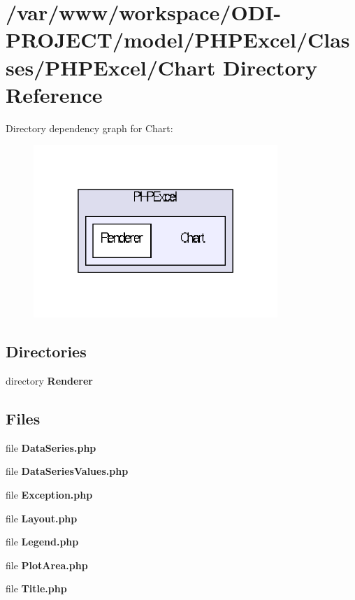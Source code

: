 \section{/var/www/workspace/\+O\+D\+I-\/\+P\+R\+O\+J\+E\+C\+T/model/\+P\+H\+P\+Excel/\+Classes/\+P\+H\+P\+Excel/\+Chart Directory Reference}
\label{dir_72b6e6015998bbe040ec2c6611d94f5b}
Directory dependency graph for Chart\+:\nopagebreak
\begin{figure}[H]
\begin{center}
\leavevmode
\includegraphics[width=262pt]{dir_72b6e6015998bbe040ec2c6611d94f5b_dep}
\end{center}
\end{figure}
\subsection*{Directories}
\begin{DoxyCompactItemize}
\item 
directory {\bf Renderer}
\end{DoxyCompactItemize}
\subsection*{Files}
\begin{DoxyCompactItemize}
\item 
file {\bfseries Data\+Series.\+php}
\item 
file {\bfseries Data\+Series\+Values.\+php}
\item 
file {\bfseries Exception.\+php}
\item 
file {\bfseries Layout.\+php}
\item 
file {\bfseries Legend.\+php}
\item 
file {\bfseries Plot\+Area.\+php}
\item 
file {\bfseries Title.\+php}
\end{DoxyCompactItemize}
